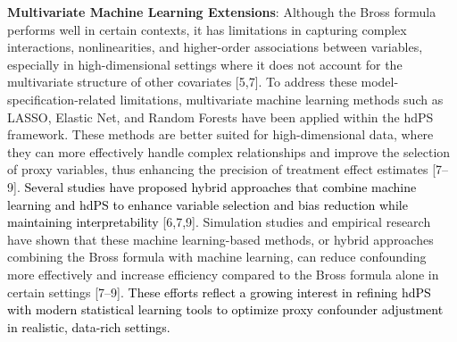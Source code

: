 \documentclass[10pt,letterpaper]{article}
\begin{document}
\textbf{Multivariate Machine Learning Extensions}: Although the Bross
formula performs well in certain contexts, it has limitations in
capturing complex interactions, nonlinearities, and higher-order
associations between variables, especially in high-dimensional settings
where it does not account for the multivariate structure of other
covariates {[}5,7{]}. To address these model-specification-related
limitations, multivariate machine learning methods such as LASSO,
Elastic Net, and Random Forests have been applied within the hdPS
framework. These methods are better suited for high-dimensional data,
where they can more effectively handle complex relationships and improve
the selection of proxy variables, thus enhancing the precision of
treatment effect estimates {[}7--9{]}.
\textcolor{black}{Several studies have proposed hybrid approaches that combine machine learning and hdPS to enhance variable selection and bias reduction while maintaining interpretability}
{[}6,7,9{]}. Simulation studies and empirical research have shown that
these machine learning-based methods, or hybrid approaches combining the
Bross formula with machine learning, can reduce confounding more
effectively and increase efficiency compared to the Bross formula alone
in certain settings {[}7--9{]}.
\textcolor{black}{These efforts reflect a growing interest in refining hdPS with modern statistical learning tools to optimize proxy confounder adjustment in realistic, data-rich settings.}
\end{document}
